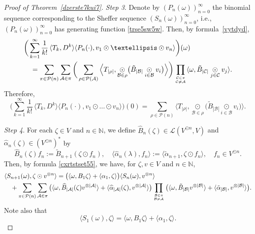 \documentclass[10pt,a4paper]{amsart}
\begin{document}
\begin{proof}[Proof of Theorem~\ref{dzerste7kui7}]
{\it Step 3}. Denote by $(P_n(\omega))_{n=0}^\infty$ the binomial sequence corresponding to the Sheffer sequence $(S_n(\omega))_{n=0}^\infty$, i.e., $(P_n(\omega))_{n=0}^\infty$ has generating function \eqref{trse5sw5w}. Then, by formula~\eqref{vytdyd}, 
\begin{align}
&\bigg(\sum_{k=1}^\infty \frac 1{k!}\,\langle T_k, D^{k}\rangle\langle P_n(\cdot),v_1\odot\dots\odot v_n\rangle\bigg)(\omega)\notag\\ 
&\quad=\sum_{\pi\in\mathcal P(n)}\sum_{\mathcal A\in\pi}
\bigg(\sum_{\rho\in\mathcal P(\mathcal A)}\Big\langle T_{|\rho|},\underset{\mathcal B\in\rho}{\odot}\big(\tilde B_{|\mathcal B|}\underset{i\in\mathcal B}\odot v_i\big)\Big\rangle \bigg)
\prod_{{\mathcal C\in\pi}\atop{\mathcal C\ne\mathcal A}}\langle\omega,\tilde B_{|\mathcal C|}\underset{j\in\mathcal C}\odot v_j \rangle.\notag
\end{align}
Therefore,
\begin{equation}\label{fdre654w6}
\bigg(\sum_{k=1}^\infty \frac 1{k!}\,\langle T_k, D^{k}\rangle\langle P_n(\cdot),v_1\odot\dots\odot v_n\rangle\bigg)(0)= \sum_{\rho\in\mathcal P(n)}\Big\langle T_{|\rho|},\underset{\mathcal B\in\rho}{\odot}\big(\tilde B_{|\mathcal B|}\underset{i\in\mathcal B}\odot v_i\big)\Big\rangle .
\end{equation}



{\it Step 4}. 
For each $\zeta\in V$ and $n\in\mathbb N$, we define $\widehat B_{n}(\zeta)\in\mathcal L(V^{\odot n},V)$ and $\widehat\alpha_{n}(\zeta)\in (V^{\odot n})^*$ by 
\begin{equation}\label{dy6de6ir5}
\widehat B_{n}(\zeta)f_n:=\tilde B_{n+1}(\zeta\odot f_n),\quad \langle\widehat\alpha_{n}(\lambda),f_n\rangle:=\langle\tilde\alpha_{n+1},\zeta\odot f_n\rangle,\quad f_n\in V^{\odot n}.
\end{equation}
Then, by formula \eqref{cxrtstset55}, we have, for $\zeta,v\in V$ and $n\in\mathbb N$,
\begin{align}
&\langle S_{n+1}(\omega),\zeta\odot v^{\otimes n}\rangle=\big(\langle\omega, B_1\zeta\rangle+\langle \alpha_1,\zeta\rangle\big)\langle S_n(\omega),v^{\otimes n}\rangle\notag\\
&\quad+\sum _{\pi\in\mathcal P(n)}\sum_{\mathcal A\in\pi} \big(\langle\omega,\widehat B_{|\mathcal A|}(\zeta)  v^{\otimes|\mathcal A|}\rangle+\langle \widehat\alpha_{|\mathcal A|}(\zeta),v^{\otimes|\mathcal A|}\rangle\big) 
\prod_{{\mathcal B\in\pi}\atop{\mathcal B\ne\mathcal A}}\big(\langle\omega,\tilde B_{|\mathcal B|}v^{\otimes|\mathcal B|}\rangle+\langle\tilde\alpha_{|\mathcal B|},v^{\otimes|\mathcal B|}\rangle\big).\label{cdtre6u}
\end{align}
Note also that
\begin{equation}
\langle S_{1}(\omega),\zeta\rangle= \langle\omega, B_1\zeta\rangle+\langle \alpha_1,\zeta\rangle.\label{vdtrs6ue}
\end{equation}


\end{proof}
\end{document}
